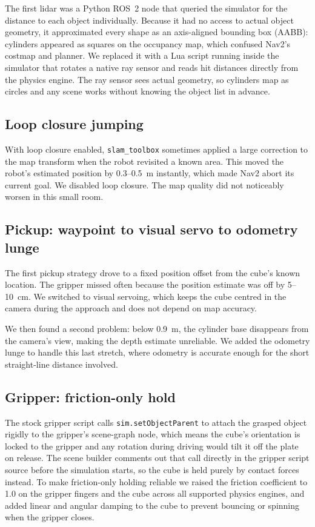 \documentclass[conference]{IEEEtran}
\begin{document}
The first lidar was a Python ROS~2 node that queried the simulator
for the distance to each object individually.
Because it had no access to actual object geometry, it approximated
every shape as an axis-aligned bounding box (AABB): cylinders
appeared as squares on the occupancy map, which confused Nav2's
costmap and planner.
We replaced it with a Lua script running inside the simulator that
rotates a native ray sensor and reads hit distances directly from
the physics engine.
The ray sensor sees actual geometry, so cylinders map as circles
and any scene works without knowing the object list in advance.

\subsection{Loop closure jumping}

With loop closure enabled, \texttt{slam\_toolbox} sometimes applied a
large correction to the map transform when the robot revisited a
known area.
This moved the robot's estimated position by 0.3--0.5~m instantly,
which made Nav2 abort its current goal.
We disabled loop closure.
The map quality did not noticeably worsen in this small room.

\subsection{Pickup: waypoint to visual servo to odometry lunge}

The first pickup strategy drove to a fixed position offset from the
cube's known location.
The gripper missed often because the position estimate was off by
5--10~cm.
We switched to visual servoing, which keeps the cube centred in the
camera during the approach and does not depend on map accuracy.

We then found a second problem: below 0.9~m, the cylinder base
disappears from the camera's view, making the depth estimate
unreliable.
We added the odometry lunge to handle this last stretch, where
odometry is accurate enough for the short straight-line distance
involved.

\subsection{Gripper: friction-only hold}

The stock gripper script calls \texttt{sim.setObjectParent} to attach
the grasped object rigidly to the gripper's scene-graph node, which
means the cube's orientation is locked to the gripper and any rotation
during driving would tilt it off the plate on release.
The scene builder comments out that call directly in the gripper
script source before the simulation starts, so the cube is held
purely by contact forces instead.
To make friction-only holding reliable we raised the friction
coefficient to 1.0 on the gripper fingers and the cube across all
supported physics engines, and added linear and angular damping to
the cube to prevent bouncing or spinning when the gripper closes.
\end{document}
